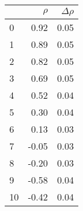 \begin{tabular}{lrr}
	\toprule
	{} & $\rho$ & $\Delta \rho$ \\
	\midrule
	0  & 0.92   & 0.05          \\
	1  & 0.89   & 0.05          \\
	2  & 0.82   & 0.05          \\
	3  & 0.69   & 0.05          \\
	4  & 0.52   & 0.04          \\
	5  & 0.30   & 0.04          \\
	6  & 0.13   & 0.03          \\
	7  & -0.05  & 0.03          \\
	8  & -0.20  & 0.03          \\
	9  & -0.58  & 0.04          \\
	10 & -0.42  & 0.04          \\
	\bottomrule
\end{tabular}
